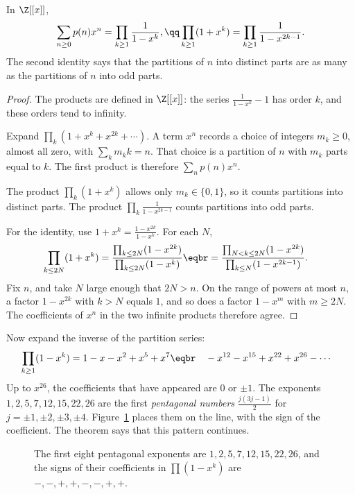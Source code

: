 \begin{proposition}[Euler]\label{prop:eulerproduct}
In $\Z[[x]]$,
\[
\begin{gathered}\sum_{n\ge0}p(n)x^n=\prod_{k\ge1}\frac1{1-x^k},\qq\prod_{k\ge1}(1+x^k)=\prod_{k\ge1}\frac1{1-x^{2k-1}}.\end{gathered}
\]
The second identity says that the partitions of $n$ into distinct parts are as many as the partitions of $n$ into odd
parts.
\end{proposition}
\begin{proof}
The products are defined in $\Z[[x]]$: the series $\frac1{1-x^k}-1$ has order $k$, and these orders tend to infinity.

Expand $\prod_k(1+x^k+x^{2k}+\cdots)$. A term $x^n$ records a choice of integers $m_k\ge0$, almost all zero, with $\sum_km_kk=n$. That choice is a partition of $n$ with $m_k$ parts equal to $k$. The first product is therefore $\sum_np(n)x^n$.

The product $\prod_k(1+x^k)$ allows only $m_k\in\{0,1\}$, so it counts partitions into distinct parts. The product $\prod_k\frac1{1-x^{2k-1}}$ counts partitions into odd parts.

For the identity, use $1+x^k=\frac{1-x^{2k}}{1-x^k}$. For each $N$,
\[
\begin{aligned}\prod_{k\le2N}(1+x^k)&=\frac{\prod_{k\le2N}(1-x^{2k})}{\prod_{k\le2N}(1-x^k)}\eqbr=\frac{\prod_{N<k\le2N}(1-x^{2k})}{\prod_{k\le N}(1-x^{2k-1})}.\end{aligned}
\]
Fix $n$, and take $N$ large enough that $2N>n$. On the range of powers at most $n$, a factor $1-x^{2k}$ with $k>N$ equals $1$, and so does a factor $1-x^m$ with $m\ge2N$. The coefficients of $x^n$ in the two infinite products therefore agree.
\end{proof}

Now expand the inverse of the partition series:
\[
\begin{aligned}\prod_{k\ge1}(1-x^k)&=1-x-x^2+x^5+x^7\eqbr\quad-x^{12}-x^{15}+x^{22}+x^{26}-\cdots\end{aligned}
\]
Up to $x^{26}$, the coefficients that have appeared are $0$ or $\pm1$. The exponents $1,2,5,7,12,15,22,26$ are the first
\emph{pentagonal numbers} $\frac{j(3j-1)}2$ for $j=\pm1,\pm2,\pm3,\pm4$. Figure~\ref{fig:rw02-pentagonal} places them on the line, with the sign of the coefficient. The theorem says that this pattern continues.

\begin{figure}[ht]
\centering
{}
\caption{The first eight pentagonal exponents are $1,2,5,7,12,15,22,26$, and the signs of their coefficients in $\prod(1-x^k)$ are $-,-,+,+,-,-,+,+$.}
\label{fig:rw02-pentagonal}
\end{figure}

